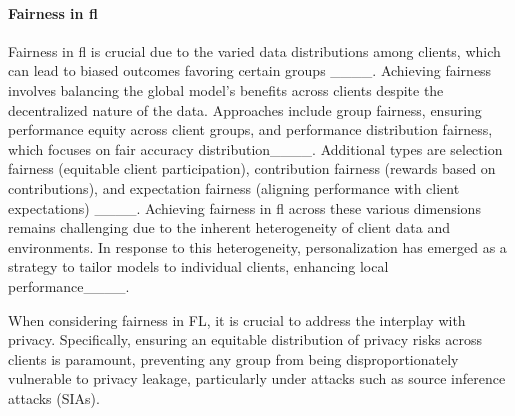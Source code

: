 \paragraph{\textbf{Fairness in \ac{fl}}}
Fairness in \ac{fl} is crucial due to the varied data distributions among clients, which can lead to biased outcomes favoring certain groups ____. Achieving fairness involves balancing the global model's benefits across clients despite the decentralized nature of the data. Approaches include group fairness, ensuring performance equity across client groups, and performance distribution fairness, which focuses on fair accuracy distribution____. Additional types are selection fairness (equitable client participation), contribution fairness (rewards based on contributions), and expectation fairness (aligning performance with client expectations) ____. Achieving fairness in \ac{fl} across these various dimensions remains challenging due to the inherent heterogeneity of client data and environments. In response to this heterogeneity, personalization has emerged as a strategy to tailor models to individual clients, enhancing local performance____.   

When considering fairness in FL, it is crucial to address the interplay with privacy. Specifically, ensuring an equitable distribution of privacy risks across clients is paramount, preventing any group from being disproportionately vulnerable to privacy leakage, particularly under attacks such as source inference attacks (SIAs).